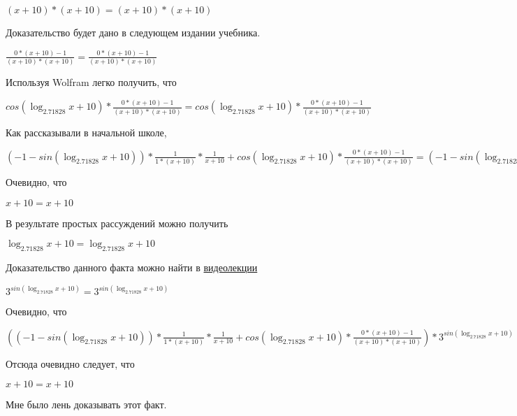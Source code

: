 \documentclass[12pt,a4paper,fleqn]{article}
\theoremstyle{definition}
\begin{document}
$( x  +  10 ) * ( x  +  10 ) = ( x  +  10 ) * ( x  +  10 )$

Доказательство будет дано в следующем издании учебника.

$\frac{ 0  * ( x  +  10 ) -  1 }{( x  +  10 ) * ( x  +  10 )}
 = \frac{ 0  * ( x  +  10 ) -  1 }{( x  +  10 ) * ( x  +  10 )}
$

Используя Wolfram легко получить, что

$cos(\log_{ 2.71828 }{ x  +  10 }) * \frac{ 0  * ( x  +  10 ) -  1 }{( x  +  10 ) * ( x  +  10 )}
 = cos(\log_{ 2.71828 }{ x  +  10 }) * \frac{ 0  * ( x  +  10 ) -  1 }{( x  +  10 ) * ( x  +  10 )}
$

Как рассказывали в начальной школе,

$( -1  - sin(\log_{ 2.71828 }{ x  +  10 })) * \frac{ 1 }{ 1  * ( x  +  10 )}
 * \frac{ 1 }{ x  +  10 }
 + cos(\log_{ 2.71828 }{ x  +  10 }) * \frac{ 0  * ( x  +  10 ) -  1 }{( x  +  10 ) * ( x  +  10 )}
 = ( -1  - sin(\log_{ 2.71828 }{ x  +  10 })) * \frac{ 1 }{ 1  * ( x  +  10 )}
 * \frac{ 1 }{ x  +  10 }
 + cos(\log_{ 2.71828 }{ x  +  10 }) * \frac{ 0  * ( x  +  10 ) -  1 }{( x  +  10 ) * ( x  +  10 )}
$

Очевидно, что

$ x  +  10  =  x  +  10 $

В результате простых рассуждений можно получить

$\log_{ 2.71828 }{ x  +  10 } = \log_{ 2.71828 }{ x  +  10 }$

Доказательство данного факта можно найти в \href{https://www.youtube.com/watch?v=dQw4w9WgXcQ}{видеолекции}

${ 3 }^{sin(\log_{ 2.71828 }{ x  +  10 })} = { 3 }^{sin(\log_{ 2.71828 }{ x  +  10 })}$

Очевидно, что

$(( -1  - sin(\log_{ 2.71828 }{ x  +  10 })) * \frac{ 1 }{ 1  * ( x  +  10 )}
 * \frac{ 1 }{ x  +  10 }
 + cos(\log_{ 2.71828 }{ x  +  10 }) * \frac{ 0  * ( x  +  10 ) -  1 }{( x  +  10 ) * ( x  +  10 )}
) * { 3 }^{sin(\log_{ 2.71828 }{ x  +  10 })} = (( -1  - sin(\log_{ 2.71828 }{ x  +  10 })) * \frac{ 1 }{ 1  * ( x  +  10 )}
 * \frac{ 1 }{ x  +  10 }
 + cos(\log_{ 2.71828 }{ x  +  10 }) * \frac{ 0  * ( x  +  10 ) -  1 }{( x  +  10 ) * ( x  +  10 )}
) * { 3 }^{sin(\log_{ 2.71828 }{ x  +  10 })}$

Отсюда очевидно следует, что

$ x  +  10  =  x  +  10 $

Мне было лень доказывать этот факт.
\end{document}
